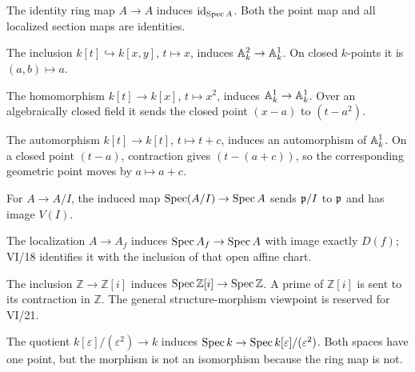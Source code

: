 \begin{example}
The identity ring map $A\to A$ induces $\operatorname{id}_{\operatorname{Spec} A}$.  Both the point map and all localized section maps are identities.
\end{example}

\begin{example}
The inclusion $k[t]\hookrightarrow k[x,y]$, $t\mapsto x$, induces $\mathbb A^2_k\to\mathbb A^1_k$.  On closed $k$-points it is $(a,b)\mapsto a$.
\end{example}

\begin{example}
The homomorphism $k[t]\to k[x]$, $t\mapsto x^2$, induces $\mathbb A^1_k\to\mathbb A^1_k$.  Over an algebraically closed field it sends the closed point $(x-a)$ to $(t-a^2)$.
\end{example}

\begin{example}[A translation]
The automorphism $k[t]\to k[t]$, $t\mapsto t+c$, induces an automorphism of $\mathbb A^1_k$.  On a closed point $(t-a)$, contraction gives $(t-(a+c))$, so the corresponding geometric point moves by $a\mapsto a+c$.
\end{example}

\begin{example}
For $A\to A/I$, the induced map $\operatorname{Spec}(A/I)\to\operatorname{Spec} A$ sends $\mathfrak p/I$ to $\mathfrak p$ and has image $V(I)$.
\end{example}

\begin{example}
The localization $A\to A_f$ induces $\operatorname{Spec} A_f\to\operatorname{Spec} A$ with image exactly $D(f)$; VI/18 identifies it with the inclusion of that open affine chart.
\end{example}

\begin{example}
The inclusion $\mathbb Z\to\mathbb Z[i]$ induces $\operatorname{Spec}\mathbb Z[i]\to\operatorname{Spec}\mathbb Z$.  A prime of $\mathbb Z[i]$ is sent to its contraction in $\mathbb Z$.  The general structure-morphism viewpoint is reserved for VI/21.
\end{example}

\begin{example}
The quotient $k[\varepsilon]/(\varepsilon^2)\to k$ induces $\operatorname{Spec} k\to\operatorname{Spec} k[\varepsilon]/(\varepsilon^2)$.  Both spaces have one point, but the morphism is not an isomorphism because the ring map is not.
\end{example}

